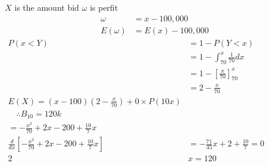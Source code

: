 \documentclass[]{article}
\begin{document}
$X$ is the amount bid $\omega$ is perfit
$$
\begin{aligned}
\omega &=x-100,000 \\
E(\omega) &=E(x)-100,000
\end{aligned}
$$
$\begin{array}{rl}P(x<Y) & =1-P(Y<x) \\ & =1-\int_{70}^x \frac{1}{70} d x \\ & =1-\left[\frac{x}{70}\right]_{70}^x \\ & =2-\frac{x}{70} \\ E(X)=(x-100)\left(2-\frac{x}{70}\right)+0 \times P(10 x)\\ \quad \therefore B_{10}=120 k \\ =-\frac{x^2}{70}+2 x-200+\frac{10}{7} x \\ \frac{d}{d x}\left[-\frac{x^2}{70}+2 x-200+\frac{10}{7} x\right] & =-\frac{71}{35} x+2+\frac{10}{7}=0 \\ 2 & x=120\end{array}$
\end{document}
